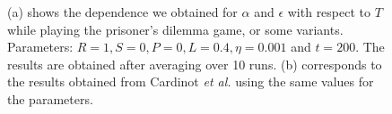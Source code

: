 \documentclass[12pt,oneside,a4paper,fleqn]{article}
\begin{document}
\begin{figure}[H]
    \centering
    \caption{(a) shows the dependence we obtained for $\alpha$ and $\epsilon$ with respect to $T$ while playing the prisoner's dilemma game, or some variants. Parameters: $R = 1, S = 0, P = 0, L = 0.4, \eta = 0.001$ and $t = 200$. The results are obtained after averaging over 10 runs. (b) corresponds to the results obtained from Cardinot \emph{et al.}  \cite{cardinot2018} using the same values for the parameters.}
    \label{fig: comparison of epsilon and alpha}
\end{figure}
\end{document}
